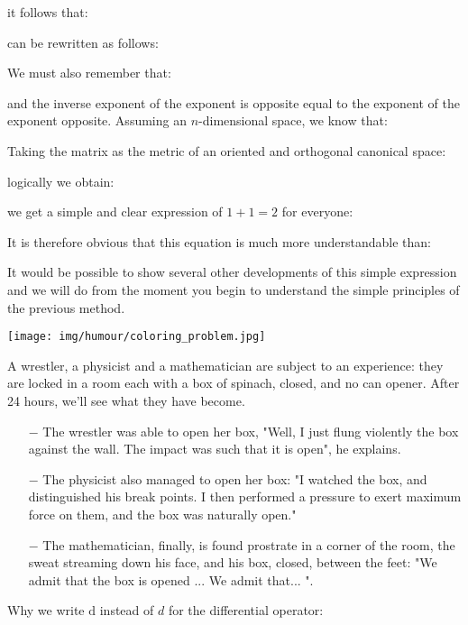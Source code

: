 	
	it follows that:
	
	
	can be rewritten as follows:
	
	
	We must also remember that:
	
	
	and the inverse exponent of the exponent is opposite equal to the exponent of the exponent opposite. Assuming an $n$-dimensional space, we know that:
	
	
	Taking the matrix as the metric of an oriented and orthogonal canonical space:
	
	
	logically we obtain:
	
	
	we get a simple and clear expression of $1+1=2$ for everyone:
	
	
	It is therefore obvious that this equation is much more understandable than:
	
	
	It would be possible to show several other developments of this simple expression and we will do from the moment you begin to understand the simple principles of the previous method.
	\begin{center}\underline{\hspace{5 cm}}\end{center}
	\begin{center}
		\texttt{[image: img/humour/coloring\_problem.jpg]}	
	\end{center}

	A wrestler, a physicist and a mathematician are subject to an experience: they are locked in a room each with a box of spinach, closed, and no can opener. After 24 hours, we'll see what they have become.
	
	\begin{itemize}	 
		\item[$-$] The wrestler was able to open her box, "Well, I just flung violently the box against the wall. The impact was such that it is open", he explains.
	
		\item[$-$] The physicist also managed to open her box: "I watched the box, and distinguished his break points. I then performed a pressure to exert maximum force on them, and the box was naturally open."
	
		\item[$-$] The mathematician, finally, is found prostrate in a corner of the room, the sweat streaming down his face, and his box, closed, between the feet: "We admit that the box is opened ... We admit that... ".
	\end{itemize}
	\begin{center}\underline{\hspace{5 cm}}\end{center}
	Why we write $\mathrm{d}$ instead of $d$ for the differential operator:
	
